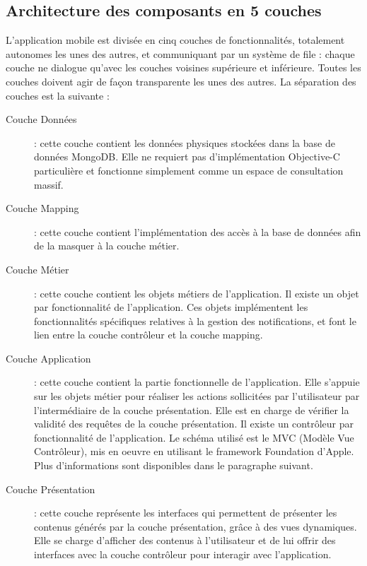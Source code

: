 \documentclass[a4paper,12pt]{report}
\begin{document}
\begin{onehalfspace}
\section{Architecture des composants en 5 couches} %
\label{sec:architecture_des_composants_en_5_couches}

L’application mobile est divisée en cinq couches de fonctionnalités, totalement autonomes les unes des autres, et communiquant par un système de file : chaque couche ne dialogue qu’avec les couches voisines supérieure et inférieure. Toutes les couches doivent agir de façon transparente les unes des autres. La séparation des couches est la suivante :

\begin{description}
\item[Couche Données]: cette couche contient les données physiques stockées dans la base de données MongoDB. Elle ne requiert pas d’implémentation Objective-C particulière et fonctionne simplement comme un espace de consultation massif.

\item[Couche Mapping]: cette couche contient l’implémentation des accès à la base de données afin de la masquer à la couche métier.

\item[Couche Métier]: cette couche contient les objets métiers de l’application. Il existe un objet par fonctionnalité de l’application. Ces objets implémentent les fonctionnalités spécifiques relatives à la gestion des notifications, et font le lien entre la couche contrôleur et la couche mapping.

\item[Couche Application]: cette couche contient la partie fonctionnelle de l’application. Elle s’appuie sur les objets métier pour réaliser les actions sollicitées par l’utilisateur par l’intermédiaire de la couche présentation. Elle est en charge de vérifier la validité des requêtes de la couche présentation. Il existe un contrôleur par fonctionnalité de l’application. Le schéma utilisé est le MVC (Modèle Vue Contrôleur), mis en oeuvre en utilisant le framework Foundation d'Apple. Plus d’informations sont disponibles dans le paragraphe suivant.

\item[Couche Présentation]: cette couche représente les interfaces qui permettent de présenter les contenus générés par la couche présentation, grâce à des vues dynamiques. Elle se charge d’afficher des contenus à l’utilisateur et de lui offrir des interfaces avec la couche contrôleur pour interagir avec l’application.
\end{description}


\end{onehalfspace}
\end{document}
